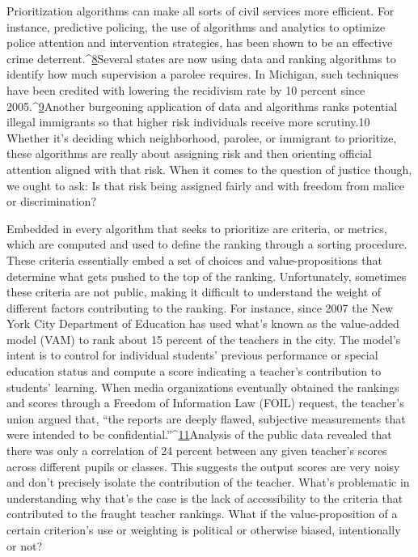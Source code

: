 Prioritization algorithms can make all sorts of civil services more efficient. For instance, predictive policing, the use of algorithms and analytics to optimize police attention and intervention strategies, has been shown to be an effective crime deterrent.^{\href{#endnotes}{8}}Several states are now using data and ranking algorithms to identify how much supervision a parolee requires. In Michigan, such techniques have been credited with lowering the recidivism rate by 10 percent since 2005.^{\href{#endnotes}{9}}Another burgeoning application of data and algorithms ranks potential illegal immigrants so that higher risk individuals receive more scrutiny.10 Whether it's deciding which neighborhood, parolee, or immigrant to prioritize, these algorithms are really about assigning risk and then orienting official attention aligned with that risk. When it comes to the question of justice though, we ought to ask: Is that risk being assigned fairly and with freedom from malice or discrimination? 

Embedded in every algorithm that seeks to prioritize are criteria, or metrics, which are computed and used to define the ranking through a sorting procedure. These criteria essentially embed a set of choices and value-propositions that determine what gets pushed to the top of the ranking. Unfortunately, sometimes these criteria are not public, making it difficult to understand the weight of different factors contributing to the ranking. For instance, since 2007 the New York City Department of Education has used what's known as the value-added model (VAM) to rank about 15 percent of the teachers in the city. The model's intent is to control for individual students' previous performance or special education status and compute a score indicating a teacher's contribution to students' learning. When media organizations eventually obtained the rankings and scores through a Freedom of Information Law (FOIL) request, the teacher's union argued that, ``the reports are deeply flawed, subjective measurements that were intended to be confidential.''^{\href{#endnotes}{11}}Analysis of the public data revealed that there was only a correlation of 24 percent between any given teacher's scores across different pupils or classes. This suggests the output scores are very noisy and don't precisely isolate the contribution of the teacher. What's problematic in understanding why that's the case is the lack of accessibility to the criteria that contributed to the fraught teacher rankings. What if the value-proposition of a certain criterion's use or weighting is political or otherwise biased, intentionally or not? 

